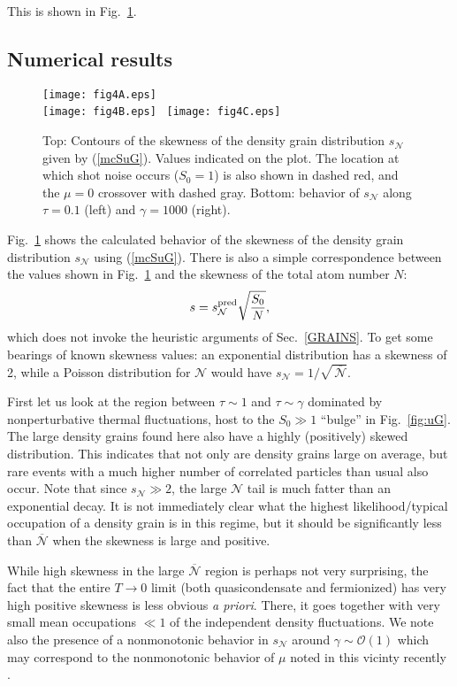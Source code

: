 \documentclass[aps,twocolumn,pra,superscriptaddress,nofootinbib,amsmath,amssymb,floats,floatfix,english]{revtex4-1}
\newcommand{\mc}[1]{{\mathcal{#1}}}
\newcommand{\wb}[1]{{\overline{#1}}}
\newcommand{\eqn}[1]{(\ref{#1})}
\renewcommand{\eq}[2]{\begin{equation}\label{#1}#2\end{equation}}
\begin{document}
This is shown in Fig.~\ref{fig:skew}.


\subsection{Numerical results}
\label{SRES}

\begin{figure}
\begin{center}
\texttt{[image: fig4A.eps]}
\\
\texttt{[image: fig4B.eps]}
\ 
\texttt{[image: fig4C.eps]}
\end{center}
\caption{
Top: Contours of the skewness of the density grain distribution $s_{\mc{N}}$ given by \eqn{mcSuG}. Values indicated on the plot. 
The location at which shot noise  occurs ($S_0=1$) is also shown in dashed red, and the $\mu=0$ crossover with dashed gray.
Bottom: behavior of $s_{\mc{N}}$ along $\tau=0.1$ (left) and $\gamma=1000$ (right).
}
\label{fig:skew}
\end{figure}

Fig.~\ref{fig:skew} shows the calculated behavior of the skewness of the density grain distribution $s_{\mc{N}}$ using \eqn{mcSuG}. 
There is also a simple correspondence between the values shown in Fig.~\ref{fig:skew} and the skewness of the total atom number $N$:  
\eq{sfig}{
s=s_{\mc{N}}^{\rm pred}\sqrt{\frac{S_0}{N}},
}
which does not invoke the heuristic arguments of Sec.~\ref{GRAINS}.
To get some bearings of known skewness values:  
an exponential distribution has a skewness of 2, while a Poisson distribution for $\mc{N}$ would have $s_{\mc{N}}=1/\sqrt{\,\wb{\mc{N}}}$.


First let us look at the region between $\tau\sim1$ and $\tau\sim\gamma$ dominated by nonperturbative thermal fluctuations, host to the $S_0\gg1$ ``bulge'' in Fig.~\ref{fig:uG}. 
The large density grains found here also have a highly (positively) skewed distribution. This indicates that not only are density grains large on average, but rare events with a much higher number of correlated particles than usual also occur. Note that since $s_{\mc{N}}\gg2$, the large $\mc{N}$ tail is much fatter than an exponential decay. It is not immediately clear what the highest likelihood/typical occupation of a density grain is in this regime, but it should be significantly less than $\wb{\mc{N}}$ when the skewness is large and positive.

While high skewness in the large $\wb{\mc{N}}$ region is perhaps not very surprising, the fact that the entire $T\to0$ limit (both quasicondensate and fermionized) has very high positive skewness is less obvious \emph{a priori}. There, it goes together with very small mean occupations $\ll1$ of the independent density fluctuations. 
We note also the presence of a nonmonotonic behavior in $s_{\mc{N}}$ around $\gamma\sim\mc{O}(1)$ which may correspond to the nonmonotonic behavior of $\mu$ noted in this vicinty recently \cite{DeRosi17}.  
\end{document}

